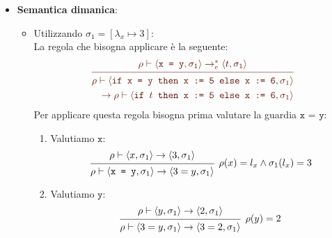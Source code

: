 \documentclass[a4paper]{article}
\begin{document}
\begin{example}
\begin{itemize}
    \item \textbf{Semantica dimanica}:
      \begin{itemize}
        \item Utilizzando \( \sigma_1 = \left[ \lambda_x \mapsto 3 \right] \):\\
          La regola che bisogna applicare è la seguente:
          \begin{equation}
            \label{eq:esecuzione_if}
            \color{\ruleCol}
            \begin{prooftree}
              \hypo{ 
                \rho \vdash \left< \texttt{x = y}, \sigma_1 \right>
                \to^*_e \left< t, \sigma_1 \right>
              }
              \infer1{ 
                \begin{aligned}
                  \rho \vdash \left<
                    \texttt{if x = y then x := 5 else x := 6},
                    \sigma_1
                  \right> \\
                  \to 
                  \rho \vdash \left<
                    \texttt{if \( t \) then x := 5 else x := 6},
                    \sigma_1
                  \right>
                \end{aligned}
              }
            \end{prooftree}
          \end{equation}
          Per applicare questa regola bisogna prima valutare la guardia \( \texttt{x = y} \):
          \begin{enumerate}
            \item Valutiamo \( \texttt{x} \):
              \[
                \begin{prooftree}
                  \hypo{ 
                    \rho \vdash \left< x, \sigma_1 \right> \to \left< 3, \sigma_1 \right>
                  }
                  \infer1[\( 
                    \rho(x) = l_x \land \sigma_1(l_x) = 3
                  \)]{ 
                    \rho \vdash \left< \texttt{x = y}, \sigma_1 \right> \to
                    \left< 3 = y, \sigma_1 \right>
                  }
                \end{prooftree}
              \] 

            \item Valutiamo \( \texttt{y} \):
              \[
                \begin{prooftree}
                  \hypo{ 
                    \rho \vdash \left< y, \sigma_1 \right> \to \left< 2, \sigma_1 \right>
                  }
                  \infer1
                  [\( 
                    \rho(y) = 2
                  \)]
                  { 
                    \rho \vdash \left< 3 = y, \sigma_1  \right> \to
                    \left< 3 = 2, \sigma_1  \right>
                  }
                \end{prooftree}
              \]


\end{enumerate}
\end{itemize}
\end{itemize}
\end{example}
\end{document}
